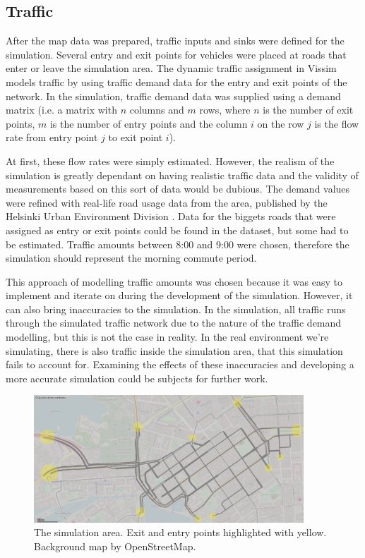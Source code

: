 \documentclass[english, 12pt, a4paper, elec, utf8, pdfa, online]{aaltothesis}
\begin{document}
\subsection{Traffic}

After the map data was prepared, traffic inputs and sinks were defined for the simulation. Several entry and exit points for vehicles were placed at roads that enter or leave the simulation area. The dynamic traffic assignment in Vissim models traffic by using traffic demand data for the entry and exit points of the network. In the simulation, traffic demand data was supplied using a demand matrix (i.e. a matrix with $n$ columns and $m$ rows, where $n$ is the number of exit points, $m$ is the number of entry points and the column $i$ on the row $j$ is the flow rate from entry point $j$ to exit point $i$).

At first, these flow rates were simply estimated. However, the realism of the simulation is greatly dependant on having realistic traffic data and the validity of measurements based on this sort of data would be dubious. The demand values were refined with real-life road usage data from the area, published by the Helsinki Urban Environment Division \cite{trafficamounts}. Data for the biggets roads that were assigned as entry or exit points could be found in the dataset, but some had to be estimated. Traffic amounts between 8:00 and 9:00 were chosen, therefore the simulation should represent the morning commute period.

This approach of modelling traffic amounts was chosen because it was easy to implement and iterate on during the development of the simulation. However, it can also bring inaccuracies to the simulation. In the simulation, all traffic runs through the simulated traffic network due to the nature of the traffic demand modelling, but this is not the case in reality. In the real environment we're simulating, there is also traffic inside the simulation area, that this simulation fails to account for. Examining the effects of these inaccuracies and developing a more accurate simulation could be subjects for further work.

\begin{figure}[h]
    \centering
    \includegraphics[width=0.9\textwidth]{graphs/vissim_map_entries}
    \caption{The simulation area. Exit and entry points highlighted with yellow. Background map by OpenStreetMap\cite{osm}.}
\end{figure}
\end{document}
